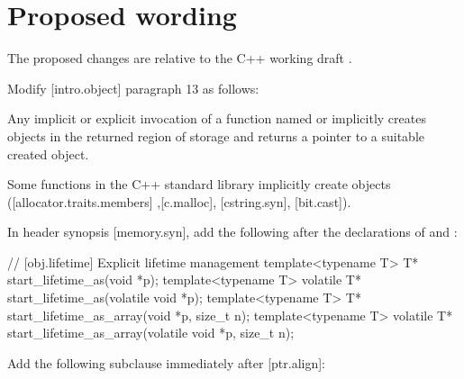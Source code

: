 
\section{Proposed wording}
\label{sec:wording}

The proposed changes are relative to the C++ working draft \cite{N4910}. 

Modify [intro.object] paragraph 13 as follows:

\begin{adjustwidth}{0.5cm}{0.5cm}
Any implicit or explicit invocation of a function
named  or 
implicitly creates objects in the returned region of storage and
returns a pointer to a suitable created object.
\begin{note}
Some functions in the C++ standard library implicitly create objects ([allocator.traits.members] ,[c.malloc], [cstring.syn], [bit.cast]).
\end{note}

\end{adjustwidth}

In header  synopsis [memory.syn], add the following after the declarations of  and :

\begin{adjustwidth}{0.5cm}{0.5cm}

\begin{addedblock}
\begin{codeblock}
// [obj.lifetime] Explicit lifetime management
template<typename T> T* start_lifetime_as(void *p);
template<typename T> volatile T* start_lifetime_as(volatile void *p);
template<typename T> T* start_lifetime_as_array(void *p, size_t n);
template<typename T> volatile T* start_lifetime_as_array(volatile void *p, size_t n);
\end{codeblock}
\end{addedblock}
\end{adjustwidth}

Add the following subclause immediately after [ptr.align]:

